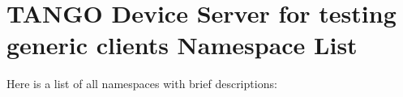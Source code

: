 \section{TANGO Device Server for testing generic clients Namespace List}
Here is a list of all namespaces with brief descriptions:\begin{CompactList}
\item{}
\end{CompactList}
